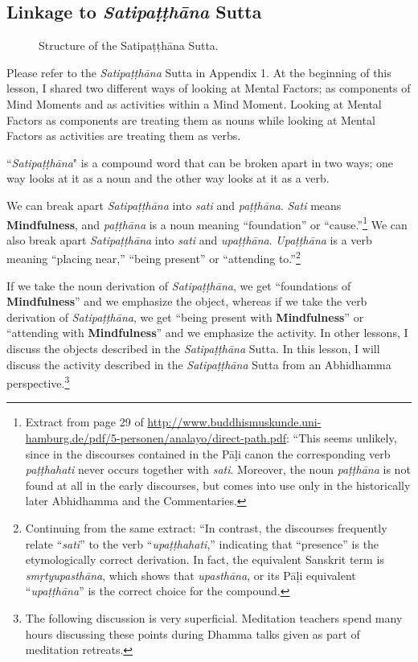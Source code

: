 \subsection*{Linkage to \textit{Satipaṭṭhāna} Sutta}

\begin{figure}[H]
\centering

\caption{Structure of the Satipaṭṭhāna Sutta.}
\label{fig:Sati}
\end{figure}

Please refer to the \textit{Satipaṭṭhāna} Sutta in Appendix 1. At the beginning of this lesson, I shared two different ways of looking at Mental Factors; as components of Mind Moments and as activities within a Mind Moment. Looking at Mental Factors as components are treating them as nouns while looking at Mental Factors as activities are treating them as verbs.

``\textit{Satipaṭṭhāna}" is a compound word that can be broken apart in two ways; one way looks at it as a noun and the other way looks at it as a verb.

\pagebreak

We can break apart \textit{Satipaṭṭhāna} into \textit{sati} and \textit{paṭṭhāna}. \textit{Sati} means \textbf{Mindfulness}, and \textit{paṭṭhāna} is a noun meaning “foundation” or “cause.”\footnote{Extract from page 29 of \url{http://www.buddhismuskunde.uni-hamburg.de/pdf/5-personen/analayo/direct-path.pdf}: “This seems unlikely, since in the discourses contained in the Pāḷi canon the corresponding verb \textit{paṭṭhahati} never occurs together with \textit{sati}. Moreover, the noun \textit{paṭṭhāna} is not found at all in the early discourses, but comes into use only in the historically later Abhidhamma and the Commentaries.} We can also break apart \textit{Satipaṭṭhāna} into \textit{sati} and \textit{upaṭṭhāna}. \textit{Upaṭṭhāna} is a verb meaning “placing near,” “being present” or “attending to.”\footnote{Continuing from the same extract: “In contrast, the discourses frequently relate “\textit{sati}” to the verb “\textit{upaṭṭhahati},” indicating that “presence” is the etymologically correct derivation. In fact, the equivalent Sanskrit term is \textit{smṛtyupasthāna}, which shows that \textit{upasthāna}, or its Pāḷi equivalent “\textit{upaṭṭhāna}” is the correct choice for the compound.}

If we take the noun derivation of \textit{Satipaṭṭhāna}, we get “foundations of \textbf{Mindfulness}” and we emphasize the object, whereas if we take the verb derivation of \textit{Satipaṭṭhāna}, we get “being present with \textbf{Mindfulness}” or “attending with \textbf{Mindfulness}” and we emphasize the activity. In other lessons, I discuss the objects described in the \textit{Satipaṭṭhāna} Sutta. In this lesson, I will discuss the activity described in the \textit{Satipaṭṭhāna} Sutta from an Abhidhamma perspective.\footnote{The following discussion is very superficial. Meditation teachers spend many hours discussing these points during Dhamma talks given as part of meditation retreats.}

